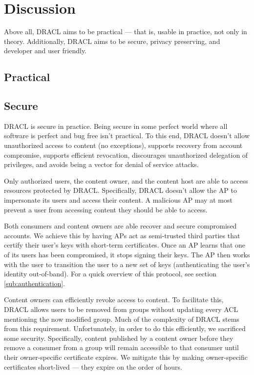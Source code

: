 \documentclass[pdftex,12pt,a4papaer]{report}
\begin{document}
\chapter{Discussion}

Above all, DRACL aims to be practical --- that is, usable in practice, not only
in theory. Additionally, DRACL aims to be secure, privacy preserving, and
developer and user friendly.

\section{Practical}


\section{Secure}
\label{sub:secure}

DRACL is secure in practice. Being secure in some perfect world where all
software is perfect and bug free isn't practical. To this end, DRACL doesn't
allow unauthorized access to content (no exceptions), supports recovery from
account compromise, supports efficient revocation, discourages unauthorized
delegation of privileges, and avoids being a vector for denial of service
attacks.

Only authorized users, the content owner, and the content host are able to
access resources protected by DRACL\@. Specifically, DRACL doesn't allow the AP
to impersonate its users and access their content. A malicious AP may at most
prevent a user from accessing content they should be able to access.

Both consumers and content owners are able recover and secure compromised
accounts. We achieve this by having APs act as semi-trusted third parties that
certify their user's keys with short-term certificates. Once an AP learns that
one of its users has been compromised, it stops signing their keys. The AP then
works with the user to transition the user to a new set of keys (authenticating
the user's identity out-of-band). For a quick overview of this protocol, see
section \ref{sub:authentication}.

Content owners can efficiently revoke access to content. To facilitate this,
DRACL allows users to be removed from groups without updating every ACL
mentioning the now modified group. Much of the complexity of DRACL stems from
this requirement. Unfortunately, in order to do this efficiently, we sacrificed
some security. Specifically, content published by a content owner before they
remove a consumer from a group will remain accessible to that consumer until
their owner-specific certificate expires. We mitigate this by making
owner-specific certificates short-lived --- they expire on the order of hours.
\end{document}
